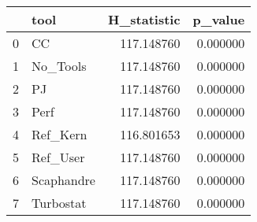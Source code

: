 \begin{tabular}{llrr}
\toprule
 & tool & H_statistic & p_value \\
\midrule
0 & CC & 117.148760 & 0.000000 \\
1 & No_Tools & 117.148760 & 0.000000 \\
2 & PJ & 117.148760 & 0.000000 \\
3 & Perf & 117.148760 & 0.000000 \\
4 & Ref_Kern & 116.801653 & 0.000000 \\
5 & Ref_User & 117.148760 & 0.000000 \\
6 & Scaphandre & 117.148760 & 0.000000 \\
7 & Turbostat & 117.148760 & 0.000000 \\
\bottomrule
\end{tabular}
